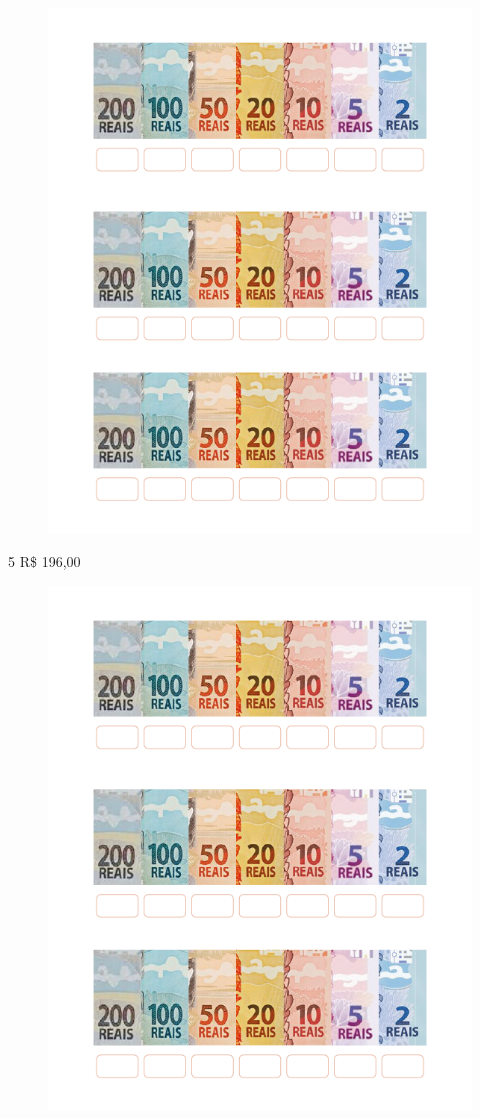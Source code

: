 \begin{figure}[htpb!]
\includegraphics[width=.8\textwidth]{./media/image67.png}
\end{figure}




\pagebreak
\num{5} R\$ 196,00

\begin{figure}[htpb!]
\includegraphics[width=.9\textwidth]{./media/image68.png}
\end{figure}

